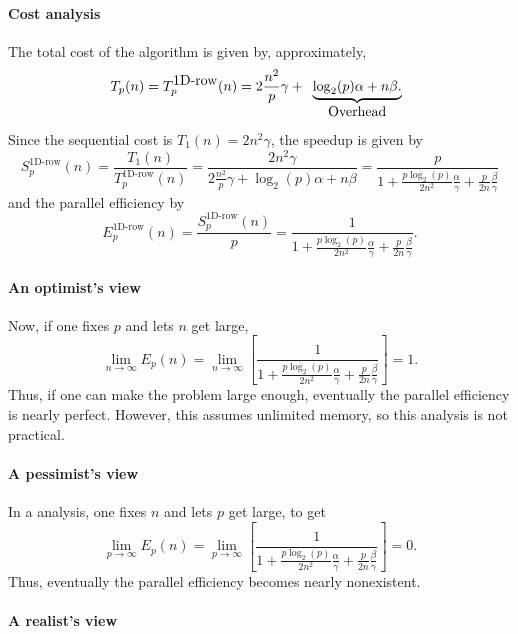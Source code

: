 \paragraph*{Cost analysis}

The total cost of the algorithm is given by, approximately,
\[
T_p(n) = T_p^{\mbox{1D-row}}(n) = 
2 \frac{n^2}{p} \gamma + 
\begin{array}[t]{c}
\underbrace{\log_2(p) \alpha + n \beta.}
\\
\mbox{Overhead}
\end{array}
\]
Since the sequential cost is $ T_1(n) = 2 n^2 \gamma $, the speedup is given by
\[
S_p^{\mbox{1D-row}}(n) = 
\frac{T_1(n)}
{T_p^{\mbox{1D-row}}(n)} = 
\frac{2 n^2 \gamma}
{ 2 \frac{n^2}{p} \gamma + 
\log_2(p) \alpha + n \beta}
= 
\frac{p}
{ 1 + \frac{p \log_2(p)}{2 n^2} \frac{\alpha}{\gamma} 
+ \frac{p}{2 n} \frac{\beta}{\gamma} }
\]
and the parallel efficiency by
\[
E_p^{\mbox{1D-row}}(n) = 
\frac{S_p^{\mbox{1D-row}}(n)}{p}
= 
\frac{1}
{ 1 + \frac{p \log_2(p)}{2 n^2} \frac{\alpha}{\gamma} 
+ \frac{p}{2 n} \frac{\beta}{\gamma} }.
\]

\paragraph*{An optimist's view}

Now, if one fixes $ p $ and lets $ n $ get large,
\[
\lim_{n \rightarrow \infty} E_p( n ) =
\lim_{n \rightarrow \infty}
\left[
\frac{1}
{ 1 + \frac{p \log_2(p)}{2 n^2} \frac{\alpha}{\gamma} 
+ \frac{p}{2 n} \frac{\beta}{\gamma} }
\right]
=
1.
\]
Thus, if one can make the problem large enough, eventually the parallel
efficiency is nearly perfect. However, this assumes unlimited memory,
so this analysis is not practical.



\paragraph*{A pessimist's view}

In a  analysis,
one fixes $ n $ and lets $ p $ get large, to get
\[
\lim_{p \rightarrow \infty} E_p( n ) =
\lim_{p \rightarrow \infty}
\left[
\frac{1}
{1 + \frac{p \log_2(p)}{2 n^2} \frac{\alpha}{\gamma} 
+ \frac{p}{2 n} \frac{\beta}{\gamma} }
\right]
=
0.
\]
Thus, eventually the parallel efficiency becomes nearly nonexistent.

\paragraph*{A realist's view}

